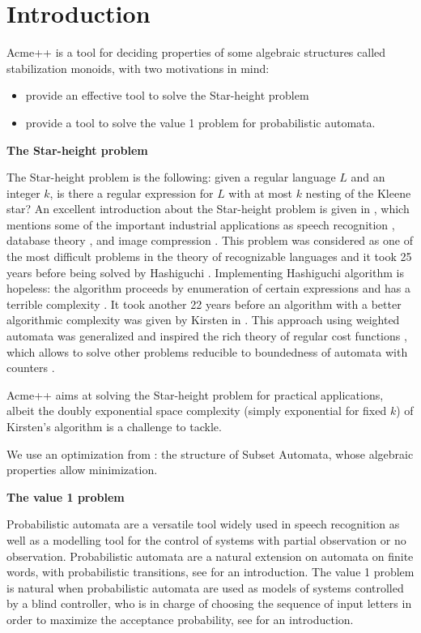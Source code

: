 \section{Introduction}

Acme++ is a tool for deciding properties of some algebraic structures called stabilization monoids,
with two motivations in mind:
\begin{itemize}
\item provide an effective tool to solve the Star-height problem
\item provide a tool to solve the value 1 problem for probabilistic automata.
\end{itemize}

\textbf{The Star-height problem}

The Star-height problem is the following: given a regular language $L$ and an integer $k$, is there a regular expression for $L$ with at most $k$ nesting of the Kleene star?
An excellent introduction about the Star-height problem is given in \cite{Kirsten05},
which mentions some of the important industrial applications as
speech recognition \cite{Mohri97}, database theory \cite{GT01}, and image compression \cite{CK93,KMT04}.
This problem was considered as one of the most difficult problems in the theory of recognizable languages
and it took 25 years before being solved by Hashiguchi \cite{Hashiguchi88}.
Implementing Hashiguchi algorithm is hopeless: the algorithm proceeds by enumeration of certain expressions
and has a terrible complexity \cite{LS02}.
It took another 22 years before an algorithm with a better algorithmic complexity was given by Kirsten in \cite{Kirsten05}.
This approach using weighted automata was generalized and inspired the rich theory of regular cost functions \cite{Colcombet09}, which allows to solve other problems reducible to boundedness of automata with counters \cite{CL08sh,CL08b,CKLB13}.

Acme++ aims at solving the Star-height problem for practical applications,
albeit the doubly exponential space complexity (simply exponential for fixed $k$) of Kirsten's algorithm is a challenge to tackle.

We use an optimization from \cite{CL08sh}: the structure of Subset Automata, whose algebraic properties allow minimization.
\smallskip

\textbf{The value 1 problem}

Probabilistic automata are a versatile tool widely used in speech recognition as well as a modelling tool 
for the control of systems with partial observation or no observation.
Probabilistic automata are a natural extension on automata on finite words,
with probabilistic transitions, see \cite{Rabin63} for an introduction.
The value 1 problem is natural when probabilistic automata are used as models
of systems controlled by a blind controller, who is in charge of choosing the
sequence of input letters in order to maximize the acceptance
probability, see \cite{FGO12} for an introduction.
\smallskip

